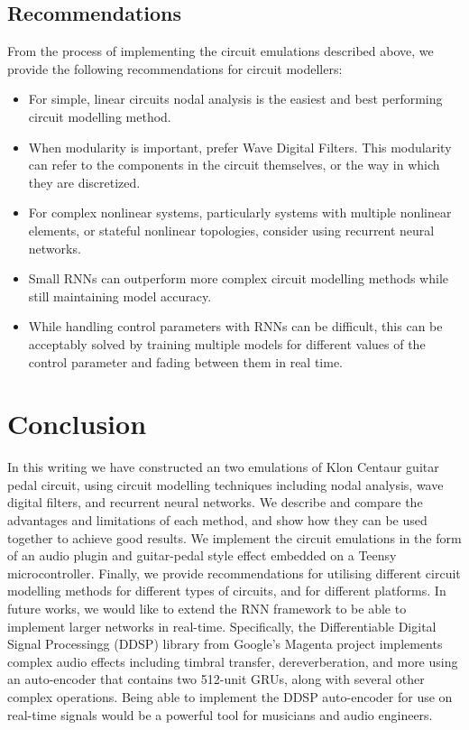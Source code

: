 \documentclass[twoside,a4paper]{article}
\begin{document}
\subsection{Recommendations}
From the process of implementing the circuit emulations described
above, we provide the following recommendations for circuit modellers:
\begin{itemize}
    \item For simple, linear circuits nodal analysis is the easiest
          and best performing circuit modelling method.
    \item When modularity is important, prefer Wave Digital Filters.
          This modularity can refer to the components in the circuit
          themselves, or the way in which they are discretized.
    \item For complex nonlinear systems, particularly systems with
          multiple nonlinear elements, or stateful nonlinear topologies,
          consider using recurrent neural networks.
    \item Small RNNs can outperform more complex circuit modelling methods
          while still maintaining model accuracy.
    \item While handling control parameters with RNNs can be difficult,
          this can be acceptably solved by training multiple models for
          different values of the control parameter and fading between them
          in real time.
\end{itemize}

\section{Conclusion}
In this writing we have constructed an two emulations of Klon
Centaur guitar pedal circuit, using circuit modelling techniques
including nodal analysis, wave digital filters, and recurrent
neural networks. We describe and compare the advantages and
limitations of each method, and show how they can be used together
to achieve good results. We implement the circuit emulations in the
form of an audio plugin and guitar-pedal style effect embedded on
a Teensy microcontroller. Finally, we provide recommendations for
utilising different circuit modelling methods for different types
of circuits, and for different platforms.
\newline\newline
In future works, we would like to extend the RNN framework to be able
to implement larger networks in real-time. Specifically, the Differentiable
Digital Signal Processingg (DDSP) library from Google's Magenta project
\cite{engel2020ddsp} implements complex audio effects including timbral
transfer, dereverberation, and more using an auto-encoder that contains
two 512-unit GRUs, along with several other complex operations. Being
able to implement the DDSP auto-encoder for use on real-time signals
would be a powerful tool for musicians and audio engineers.
\end{document}
